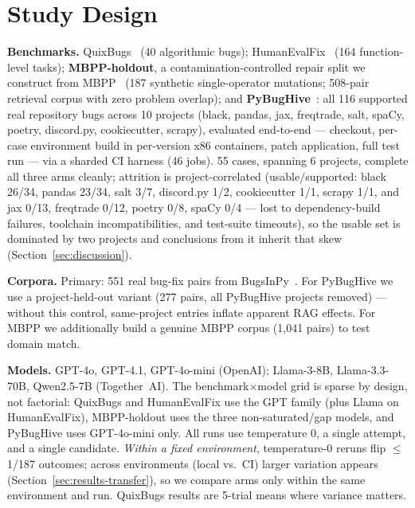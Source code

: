 \documentclass[10pt,conference,a4paper]{IEEEtran}
\begin{document}
\section{Study Design}
\label{sec:design}

\textbf{Benchmarks.} QuixBugs~\cite{quixbugs} (40 algorithmic bugs);
HumanEvalFix~\cite{octopack} (164 function-level tasks);
\textbf{MBPP-holdout}, a contamination-controlled repair split we construct
from MBPP~\cite{mbpp} (187 synthetic single-operator mutations; 508-pair
retrieval corpus with zero problem overlap); and
\textbf{PyBugHive}~\cite{pybughive}: all 116 supported real repository bugs
across 10 projects (black, pandas, jax, freqtrade, salt, spaCy, poetry,
discord.py, cookiecutter, scrapy), evaluated end-to-end --- checkout,
per-case environment build in per-version x86 containers, patch application,
full test run --- via a sharded CI harness (46 jobs). 55 cases, spanning 6
projects, complete all three arms cleanly; attrition is project-correlated
(usable/supported: black 26/34, pandas 23/34, salt 3/7, discord.py 1/2,
cookiecutter 1/1, scrapy 1/1, and jax 0/13, freqtrade 0/12, poetry 0/8,
spaCy 0/4 --- lost to dependency-build failures, toolchain incompatibilities,
and test-suite timeouts), so the usable set is dominated by two projects and
conclusions from it inherit that skew (Section~\ref{sec:discussion}).

\textbf{Corpora.} Primary: 551 real bug-fix pairs from
BugsInPy~\cite{bugsinpy}. For PyBugHive we use a project-held-out variant
(277 pairs, all PyBugHive projects removed) --- without this control,
same-project entries inflate apparent RAG effects. For MBPP we additionally
build a genuine MBPP corpus (1{,}041 pairs) to test domain match.

\textbf{Models.} GPT-4o, GPT-4.1, GPT-4o-mini (OpenAI); Llama-3-8B,
Llama-3.3-70B, Qwen2.5-7B (Together~AI). The benchmark$\times$model grid is
sparse by design, not factorial: QuixBugs and HumanEvalFix use the GPT
family (plus Llama on HumanEvalFix), MBPP-holdout uses the three
non-saturated/gap models, and PyBugHive uses GPT-4o-mini only. All runs use
temperature 0, a single attempt, and a single candidate. \emph{Within a
fixed environment}, temperature-0 reruns flip $\le$1/187 outcomes; across
environments (local vs.\ CI) larger variation appears
(Section~\ref{sec:results-transfer}), so we compare arms only within the
same environment and run. QuixBugs results are 5-trial means where variance
matters.
\end{document}
